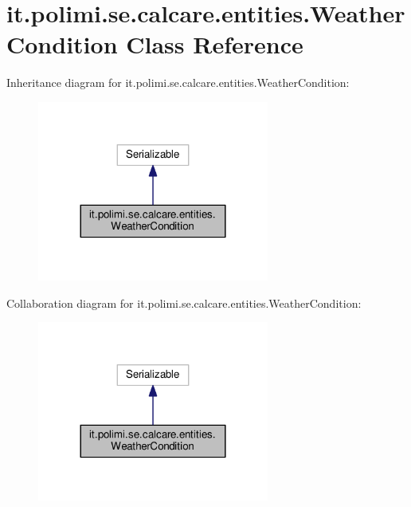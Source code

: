 \hypertarget{classit_1_1polimi_1_1se_1_1calcare_1_1entities_1_1WeatherCondition}{}\section{it.\+polimi.\+se.\+calcare.\+entities.\+Weather\+Condition Class Reference}
\label{classit_1_1polimi_1_1se_1_1calcare_1_1entities_1_1WeatherCondition}


Inheritance diagram for it.\+polimi.\+se.\+calcare.\+entities.\+Weather\+Condition\+:
\nopagebreak
\begin{figure}[H]
\begin{center}
\leavevmode
\includegraphics[width=216pt]{classit_1_1polimi_1_1se_1_1calcare_1_1entities_1_1WeatherCondition__inherit__graph}
\end{center}
\end{figure}


Collaboration diagram for it.\+polimi.\+se.\+calcare.\+entities.\+Weather\+Condition\+:
\nopagebreak
\begin{figure}[H]
\begin{center}
\leavevmode
\includegraphics[width=216pt]{classit_1_1polimi_1_1se_1_1calcare_1_1entities_1_1WeatherCondition__coll__graph}
\end{center}
\end{figure}
